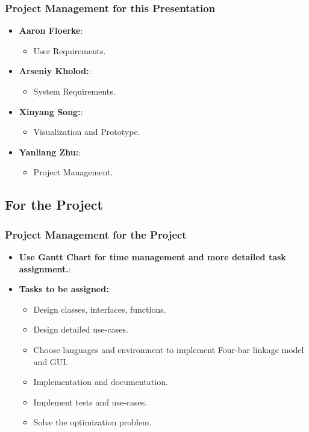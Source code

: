 \documentclass[ucs,10pt]{beamer}
\begin{document}
\begin{frame}
\frametitle{Project Management for this Presentation}
    \begin{itemize}
        \item \textbf{Aaron Floerke}:
        \begin{itemize}
            \item User Requirements.
        \end{itemize}
        \item \textbf{Arseniy Kholod:}:
        \begin{itemize}
            \item System Requirements.
        \end{itemize}        
        \item \textbf{Xinyang Song:}:
        \begin{itemize}
            \item Visualization and Prototype.
        \end{itemize}       
        \item \textbf{Yanliang Zhu:}:
        \begin{itemize}
            \item Project Management.
        \end{itemize}        
    \end{itemize}
\end{frame}


\subsection{For the Project}


\begin{frame}
\frametitle{Project Management for the Project}
    \begin{itemize}
        \item \textbf{Use Gantt Chart for time management and more detailed task assignment.}:
        \item \textbf{Tasks to be assigned:}:
        \begin{itemize}
            \item Design classes, interfaces, functions.
            \item Design detailed use-cases.
            \item Choose languages and environment to implement Four-bar linkage model and GUI.
            \item Implementation and documentation.
            \item Implement tests and use-cases.
            \item Solve the optimization problem.
        \end{itemize}
    \end{itemize}
\end{frame}
\end{document}
